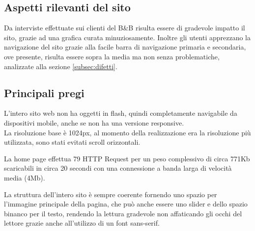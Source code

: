 \documentclass[a4paper,12pt,hidelinks]{report}
\begin{document}
\subsection{Aspetti rilevanti del sito}
  Da interviste effettuate sui clienti del B\&B risulta essere di gradevole impatto il sito, grazie ad una grafica curata minuziosamente.
  Inoltre gli utenti apprezzano la navigazione del sito grazie alla facile barra di navigazione primaria e secondaria, ove presente, risulta essere sopra la media ma non 
  senza problematiche, analizzate alla sezione \ref{subsec:difetti}.

\subsection{Principali pregi}
  L'intero sito web non ha oggetti in flash, quindi completamente navigabile da dispositivi mobile, anche se non ha una versione responsive.
  \\La risoluzione base è 1024px, al momento della realizzazione era la risoluzione più utilizzata, sono stati evitati scroll orizzontali. 
  \par La home page effettua 79 HTTP Request per un peso complessivo di circa 771Kb scaricabili in circa 20 secondi con una connessione a banda larga di velocità media (4Mb).
  \par La struttura dell'intero sito è sempre coerente fornendo uno spazio per l'immagine principale della pagina, che può anche essere uno slider 
  e dello spazio binanco per il testo, rendendo la lettura gradevole non affaticando gli occhi del lettore grazie anche all'utilizzo di un font sans-serif.
\end{document}
